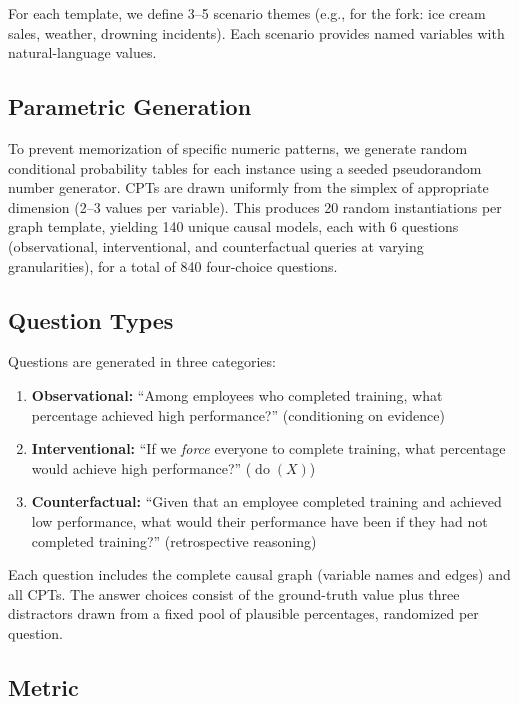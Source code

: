 \documentclass[11pt,a4paper]{article}
\begin{document}
For each template, we define 3--5 scenario themes (e.g., for the fork: ice cream sales, weather, drowning incidents). Each scenario provides named variables with natural-language values.

\subsection{Parametric Generation}

To prevent memorization of specific numeric patterns, we generate random conditional probability tables for each instance using a seeded pseudorandom number generator. CPTs are drawn uniformly from the simplex of appropriate dimension (2--3 values per variable). This produces 20 random instantiations per graph template, yielding 140 unique causal models, each with 6 questions (observational, interventional, and counterfactual queries at varying granularities), for a total of 840 four-choice questions.

\subsection{Question Types}

Questions are generated in three categories:

\begin{enumerate}
  \item \textbf{Observational:} ``Among employees who completed training, what percentage achieved high performance?'' (conditioning on evidence)
  \item \textbf{Interventional:} ``If we \emph{force} everyone to complete training, what percentage would achieve high performance?'' ($\operatorname{do}(X)$)
  \item \textbf{Counterfactual:} ``Given that an employee completed training and achieved low performance, what would their performance have been if they had not completed training?'' (retrospective reasoning)
\end{enumerate}

Each question includes the complete causal graph (variable names and edges) and all CPTs. The answer choices consist of the ground-truth value plus three distractors drawn from a fixed pool of plausible percentages, randomized per question.

\subsection{Metric}
\end{document}
